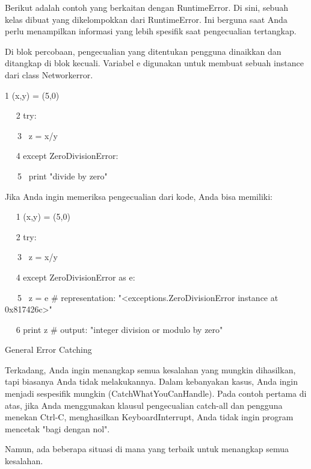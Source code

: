 \vspace{12pt}
Berikut adalah contoh yang berkaitan dengan RuntimeError. Di sini, sebuah kelas dibuat yang dikelompokkan dari RuntimeError. Ini berguna saat Anda perlu menampilkan informasi yang lebih spesifik saat pengecualian tertangkap. \par
\vspace{12pt}
Di blok percobaan, pengecualian yang ditentukan pengguna dinaikkan dan ditangkap di blok kecuali. Variabel e digunakan untuk membuat sebuah instance dari class Networkerror. \par
\vspace{12pt}
1 (x,y) = (5,0) \par
~~ 2 try: \par
~~~3~  z = x/y \par
~~ 4 except ZeroDivisionError: \par
~~~5~  print "divide by zero" \par
Jika Anda ingin memeriksa pengecualian dari kode, Anda bisa memiliki: \par
\vspace{12pt}
\vspace{12pt}
\vspace{12pt}
~~ 1 (x,y) = (5,0) \par
~~ 2 try: \par
~~~3~  z = x/y \par
~~ 4 except ZeroDivisionError as e: \par
~~~5~  z = e  $  \#  $ representation: "<exceptions.ZeroDivisionError instance at 0x817426c>" \par
~~ 6 print z  $  \#  $ output: "integer division or modulo by zero" \par
\vspace{12pt}
General Error Catching \par
\vspace{12pt}
Terkadang, Anda ingin menangkap semua kesalahan yang mungkin dihasilkan, tapi biasanya Anda tidak melakukannya. Dalam kebanyakan kasus, Anda ingin menjadi sespesifik mungkin (CatchWhatYouCanHandle). Pada contoh pertama di atas, jika Anda menggunakan klausul pengecualian catch-all dan pengguna menekan Ctrl-C, menghasilkan KeyboardInterrupt, Anda tidak ingin program mencetak "bagi dengan nol". \par
\vspace{12pt}
Namun, ada beberapa situasi di mana yang terbaik untuk menangkap semua kesalahan. \par
\vspace{12pt}
